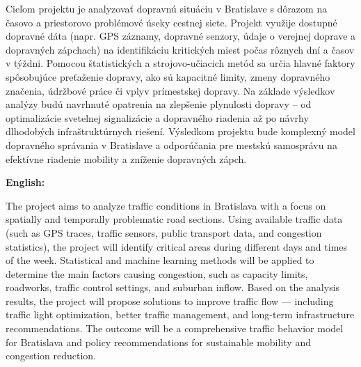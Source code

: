 \documentclass[12pt,a4paper]{article}
\begin{document}
Cieľom projektu je analyzovať dopravnú situáciu v Bratislave s dôrazom na časovo a priestorovo problémové úseky cestnej siete. Projekt využije dostupné dopravné dáta (napr. GPS záznamy, dopravné senzory, údaje o verejnej doprave a dopravných zápchach) na identifikáciu kritických miest počas rôznych dní a časov v týždni. Pomocou štatistických a strojovo-učiacich metód sa určia hlavné faktory spôsobujúce preťaženie dopravy, ako sú kapacitné limity, zmeny dopravného značenia, údržbové práce či vplyv prímestskej dopravy. Na základe výsledkov analýzy budú navrhnuté opatrenia na zlepšenie plynulosti dopravy – od optimalizácie svetelnej signalizácie a dopravného riadenia až po návrhy dlhodobých infraštruktúrnych riešení. Výsledkom projektu bude komplexný model dopravného správania v Bratislave a odporúčania pre mestskú samosprávu na efektívne riadenie mobility a zníženie dopravných zápch.

\vspace{1em}

\noindent\textbf{English:}

The project aims to analyze traffic conditions in Bratislava with a focus on spatially and temporally problematic road sections. Using available traffic data (such as GPS traces, traffic sensors, public transport data, and congestion statistics), the project will identify critical areas during different days and times of the week. Statistical and machine learning methods will be applied to determine the main factors causing congestion, such as capacity limits, roadworks, traffic control settings, and suburban inflow. Based on the analysis results, the project will propose solutions to improve traffic flow — including traffic light optimization, better traffic management, and long-term infrastructure recommendations. The outcome will be a comprehensive traffic behavior model for Bratislava and policy recommendations for sustainable mobility and congestion reduction.


\end{document}
